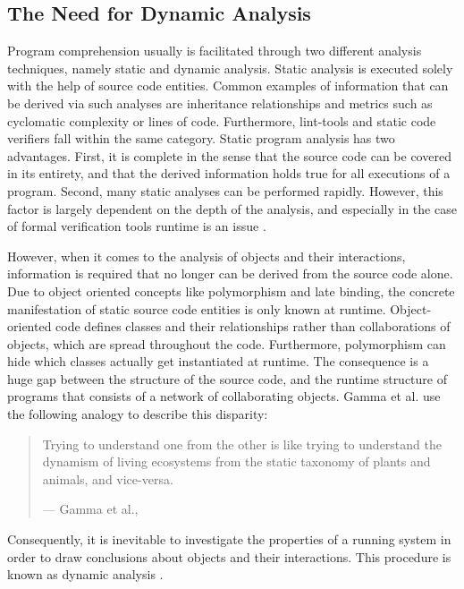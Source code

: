 \subsection{The Need for Dynamic Analysis}
\label{ss:BackgroundAnalysisNeccessity}
Program comprehension usually is facilitated through two different analysis techniques, namely static and dynamic analysis.
Static analysis is executed solely with the help of source code entities.
Common examples of information that can be derived via such analyses are inheritance relationships and metrics such as cyclomatic complexity or lines of code.
Furthermore, lint-tools and static code verifiers fall within the same category.
Static program analysis has two advantages.
First, it is complete in the sense that the source code can be covered in its entirety, and that the derived information holds true for all executions of a program.
Second, many static analyses can be performed rapidly.
However, this factor is largely dependent on the depth of the analysis, and especially in the case of formal verification tools runtime is an issue \cite{wichmann_industrial_1995}.

However, when it comes to the analysis of objects and their interactions, information is required that no longer can be derived from the source code alone.
Due to object oriented concepts like polymorphism and late binding, the concrete manifestation of static source code entities is only known at runtime.
Object-oriented code defines classes and their relationships rather than collaborations of objects, which are spread throughout the code.
Furthermore, polymorphism can hide which classes actually get instantiated at runtime.
The consequence is a huge gap between the structure of the source code, and the runtime structure of programs that consists of a network of collaborating objects.
Gamma et al. use the following analogy to describe this disparity:

\begin{quote}
Trying to understand one from the other is like trying to understand the dynamism of living ecosystems from the static taxonomy of plants and animals, and vice-versa.
\par\raggedleft--- \textup{Gamma et al.}, \cite{gamma_design_1995}
\end{quote}

Consequently, it is inevitable to investigate the properties of a running system in order to draw conclusions about objects and their interactions.
This procedure is known as dynamic analysis \cite{bell_concept_1999}.

